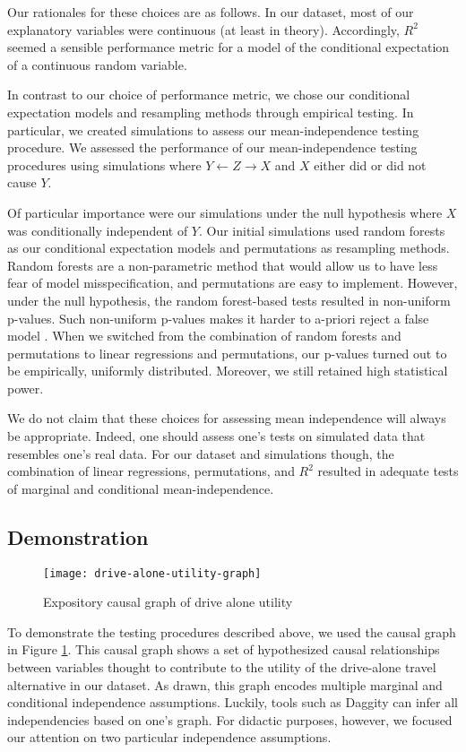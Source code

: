 Our rationales for these choices are as follows.
In our dataset, most of our explanatory variables were continuous (at least in theory).
Accordingly, $R^2$ seemed a sensible performance metric for a model of the conditional expectation of a continuous random variable.

In contrast to our choice of performance metric, we chose our conditional expectation models and resampling methods through empirical testing.
In particular, we created simulations to assess our mean-independence testing procedure.
We assessed the performance of our mean-independence testing procedures using simulations where $Y \leftarrow Z \rightarrow X$ and $X$ either did or did not cause $Y$.

Of particular importance were our simulations under the null hypothesis where $X$ was conditionally independent of $Y$.
Our initial simulations used random forests as our conditional expectation models and permutations as resampling methods.
Random forests are a non-parametric method that would allow us to have less fear of model misspecification, and permutations are easy to implement.
However, under the null hypothesis, the random forest-based tests resulted in non-uniform p-values.
Such non-uniform p-values makes it harder to a-priori reject a false model \citep{gelman_2013_two}.
When we switched from the combination of random forests and permutations to linear regressions and permutations, our p-values turned out to be empirically, uniformly distributed.
Moreover, we still retained high statistical power.

We do not claim that these choices for assessing mean independence will always be appropriate.
Indeed, one should assess one's tests on simulated data that resembles one's real data.
For our dataset and simulations though, the combination of linear regressions, permutations, and $R^2$ resulted in adequate tests of marginal and conditional mean-independence.

\subsection{Demonstration}
\label{sec:testing-demonstration}

\begin{figure}
   \centering
   \texttt{[image: drive-alone-utility-graph]}
   \caption{Expository causal graph of drive alone utility}
   \label{fig:graph-for-testing}
\end{figure}
To demonstrate the testing procedures described above, we used the causal graph in Figure \ref{fig:graph-for-testing}.
This causal graph shows a set of hypothesized causal relationships between variables thought to contribute to the utility of the drive-alone travel alternative in our dataset.
As drawn, this graph encodes multiple marginal and conditional independence assumptions.
Luckily, tools such as Daggity \citep{textor_2016_robust} can infer all independencies based on one's graph.
For didactic purposes, however, we focused our attention on two particular independence assumptions.

